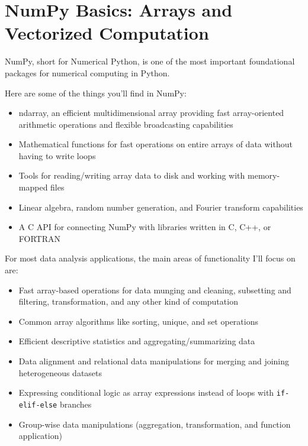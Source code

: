 \chapter{NumPy Basics: Arrays and Vectorized Computation}
NumPy, short for Numerical Python, is one of the most important foundational packages for numerical computing in Python. 

Here are some of the things you'll find in NumPy:
\begin{itemize}
    \item ndarray, an efficient multidimensional array providing fast array-oriented arithmetic operations and flexible broadcasting capabilities
    \item Mathematical functions for fast operations on entire arrays of data without having to write loops
    \item Tools for reading/writing array data to disk and working with memory-mapped files
    \item Linear algebra, random number generation, and Fourier transform capabilities
    \item A C API for connecting NumPy with libraries written in C, C++, or FORTRAN
\end{itemize}

For most data analysis applications, the main areas of functionality I'll focus on are:

\begin{itemize}
    \item Fast array-based operations for data munging and cleaning, subsetting and filtering, transformation, and any other kind of computation
    \item Common array algorithms like sorting, unique, and set operations
    \item Efficient descriptive statistics and aggregating/summarizing data
    \item Data alignment and relational data manipulations for merging and joining heterogeneous datasets
    \item Expressing conditional logic as array expressions instead of loops with \verb|if-elif-else| branches
    \item Group-wise data manipulations (aggregation, transformation, and function application)
\end{itemize}

